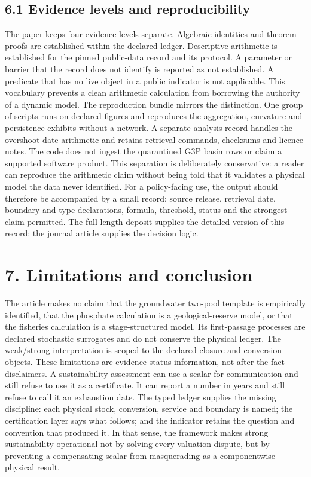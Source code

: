 \documentclass[11pt]{article}
\begin{document}
\subsection{6.1 Evidence levels and reproducibility}
The paper keeps four evidence levels separate. Algebraic identities and theorem proofs are established within the declared ledger. Descriptive arithmetic is established for the pinned public-data record and its protocol. A parameter or barrier that the record does not identify is reported as not established. A predicate that has no live object in a public indicator is not applicable. This vocabulary prevents a clean arithmetic calculation from borrowing the authority of a dynamic model.
The reproduction bundle mirrors the distinction. One group of scripts runs on declared figures and reproduces the aggregation, curvature and persistence exhibits without a network. A separate analysis record handles the overshoot-date arithmetic and retains retrieval commands, checksums and licence notes. The code does not ingest the quarantined G3P basin rows or claim a supported software product. This separation is deliberately conservative: a reader can reproduce the arithmetic claim without being told that it validates a physical model the data never identified.
For a policy-facing use, the output should therefore be accompanied by a small record: source release, retrieval date, boundary and type declarations, formula, threshold, status and the strongest claim permitted. The full-length deposit supplies the detailed version of this record; the journal article supplies the decision logic.
\section{7. Limitations and conclusion}
The article makes no claim that the groundwater two-pool template is empirically identified, that the phosphate calculation is a geological-reserve model, or that the fisheries calculation is a stage-structured model. Its first-passage processes are declared stochastic surrogates and do not conserve the physical ledger. The weak/strong interpretation is scoped to the declared closure and conversion objects. These limitations are evidence-status information, not after-the-fact disclaimers.
A sustainability assessment can use a scalar for communication and still refuse to use it as a certificate. It can report a number in years and still refuse to call it an exhaustion date. The typed ledger supplies the missing discipline: each physical stock, conversion, service and boundary is named; the certification layer says what follows; and the indicator retains the question and convention that produced it. In that sense, the framework makes strong sustainability operational not by solving every valuation dispute, but by preventing a compensating scalar from masquerading as a componentwise physical result.
\end{document}
